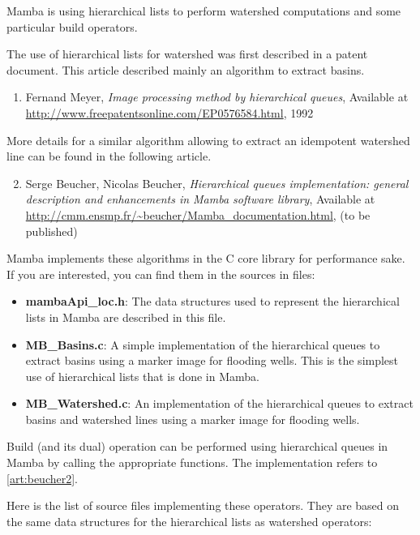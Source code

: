\documentclass[a4paper,10pt,oneside]{article}
\begin{document}
Mamba is using hierarchical lists to perform watershed computations and some
particular build operators.

The use of hierarchical lists for watershed was first described in a patent 
document. This article described mainly an algorithm to extract basins.

\begin{enumerate}
\setcounter{enumi}{0}
\item \label{art:meyer} Fernand Meyer,
\emph{Image processing method by hierarchical queues},
Available at \url{http://www.freepatentsonline.com/EP0576584.html}, 1992
\end{enumerate}

More details for a similar algorithm allowing to extract an idempotent 
watershed line can be found in the following article.

\begin{enumerate}
\setcounter{enumi}{1}
\item \label{art:beucher2} Serge Beucher, Nicolas Beucher,
\emph{Hierarchical queues implementation: general description and enhancements
in Mamba software library},
Available at \url{http://cmm.ensmp.fr/\~beucher/Mamba\_documentation.html},
(to be published)
\end{enumerate}

Mamba implements these algorithms in the C core library for performance sake.
If you are interested, you can find them in the sources in files:

\begin{itemize}
\item \textbf{mambaApi\_loc.h}: The data structures used to represent the 
hierarchical lists in Mamba are described in this file.
\item \textbf{MB\_Basins.c}: A simple implementation of the hierarchical queues
to extract basins using a marker image for flooding wells. This is the simplest
use of hierarchical lists that is done in Mamba.
\item \textbf{MB\_Watershed.c}: An implementation of the hierarchical queues to
extract basins and watershed lines using a marker image for flooding wells.
\end{itemize}

Build (and its dual) operation can be performed using hierarchical queues in
Mamba by calling the appropriate functions. The implementation refers to
\ref{art:beucher2}.

Here is the list of source files implementing these operators. They are based on
the same data structures for the hierarchical lists as watershed operators:
\end{document}
